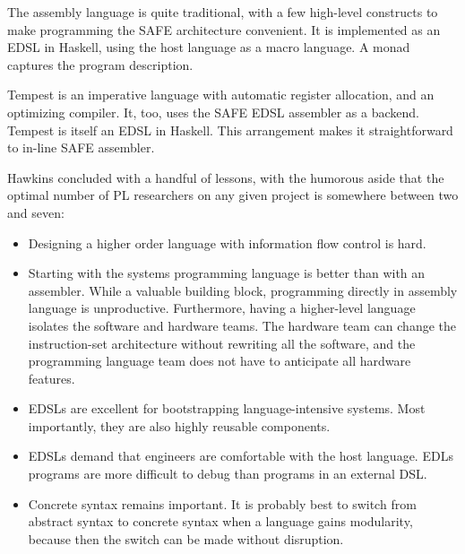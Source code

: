 \documentclass{jfp1}
\begin{document}
The assembly language is quite traditional, with a few high-level
constructs to make programming the SAFE architecture convenient. It is
implemented as an EDSL in Haskell, using the host language as a macro
language. A monad captures the program description.

Tempest is an imperative language with automatic register allocation, and
an optimizing compiler. It, too, uses the SAFE EDSL assembler as a
backend. Tempest is itself an EDSL in Haskell. This arrangement makes it
straightforward to in-line SAFE assembler.

Hawkins concluded with a handful of lessons, with the humorous aside that
the optimal number of PL researchers on any given project is somewhere
between two and seven:
\begin{itemize}

\item Designing a higher order language with information flow control
is hard. 

\item Starting with the systems programming language is better than with
an assembler.  While a valuable building block, programming directly in
assembly language is unproductive. Furthermore, having a higher-level
language isolates the software and hardware teams. The hardware team can
change the instruction-set architecture without rewriting all the
software, and the programming language team does not have to anticipate
all hardware features. 

\item EDSLs are excellent for bootstrapping language-intensive systems.
Most importantly, they are also highly reusable components.

\item EDSLs demand that engineers are comfortable with the host language.
EDLs programs are more difficult to debug than programs in an external DSL. 

\item Concrete syntax remains important. It is probably best to switch
from abstract syntax to concrete syntax when a language gains modularity,
because then the switch can be made without disruption.
\end{itemize}

\end{document}
